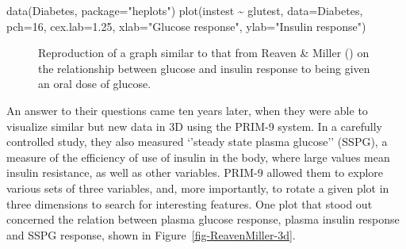 \documentclass[
  letterpaper,
  10pt,
  krantz2]{krantz}
\makeatletter
\newenvironment{Shaded}{\begin{snugshade}}{\end{snugshade}}
\newcommand{\AttributeTok}[1]{\textcolor[rgb]{0.40,0.45,0.13}{#1}}
\newcommand{\DecValTok}[1]{\textcolor[rgb]{0.68,0.00,0.00}{#1}}
\newcommand{\FloatTok}[1]{\textcolor[rgb]{0.68,0.00,0.00}{#1}}
\newcommand{\FunctionTok}[1]{\textcolor[rgb]{0.28,0.35,0.67}{#1}}
\newcommand{\NormalTok}[1]{\textcolor[rgb]{0.00,0.23,0.31}{#1}}
\newcommand{\SpecialCharTok}[1]{\textcolor[rgb]{0.37,0.37,0.37}{#1}}
\newcommand{\StringTok}[1]{\textcolor[rgb]{0.13,0.47,0.30}{#1}}
\newenvironment{kframe}{%
  \medskip{}
  \setlength{\fboxsep}{.8em}
  \def\at@end@of@kframe{}%
  \ifinner\ifhmode%
  \def\at@end@of@kframe{\end{minipage}}%
  \begin{minipage}{\columnwidth}%
  \fi\fi%
  \def\FrameCommand##1{\hskip\@totalleftmargin \hskip-\fboxsep
  \colorbox{shadecolor}{##1}\hskip-\fboxsep
      \hskip-\linewidth \hskip-\@totalleftmargin \hskip\columnwidth}%
  \MakeFramed {\advance\hsize-\width
    \@totalleftmargin\z@ \linewidth\hsize
    \@setminipage}}%
{\par\unskip\endMakeFramed%
  \at@end@of@kframe}
\renewenvironment{Shaded}{\begin{kframe}}{\end{kframe}}
\makeatother
\begin{document}
\begin{Shaded}
\begin{Highlighting}[]
\FunctionTok{data}\NormalTok{(Diabetes, }\AttributeTok{package=}\StringTok{"heplots"}\NormalTok{)}
\FunctionTok{plot}\NormalTok{(instest }\SpecialCharTok{\textasciitilde{}}\NormalTok{ glutest, }\AttributeTok{data=}\NormalTok{Diabetes, }
     \AttributeTok{pch=}\DecValTok{16}\NormalTok{,}
     \AttributeTok{cex.lab=}\FloatTok{1.25}\NormalTok{,}
     \AttributeTok{xlab=}\StringTok{"Glucose response"}\NormalTok{,}
     \AttributeTok{ylab=}\StringTok{"Insulin response"}\NormalTok{)}
\end{Highlighting}
\end{Shaded}

\begin{figure}


\caption{\label{fig-diabetes1}Reproduction of a graph similar to that
from Reaven \& Miller () on the
relationship between glucose and insulin response to being given an oral
dose of glucose.}

\end{figure}%

An answer to their questions came ten years later, when they were able
to visualize similar but new data in 3D using the PRIM-9 system. In a
carefully controlled study, they also measured `'steady state plasma
glucose'' (SSPG), a measure of the efficiency of use of insulin in the
body, where large values mean insulin resistance, as well as other
variables. PRIM-9 allowed them to explore various sets of three
variables, and, more importantly, to rotate a given plot in three
dimensions to search for interesting features. One plot that stood out
concerned the relation between plasma glucose response, plasma insulin
response and SSPG response, shown in Figure~\ref{fig-ReavenMiller-3d}.
\end{document}
